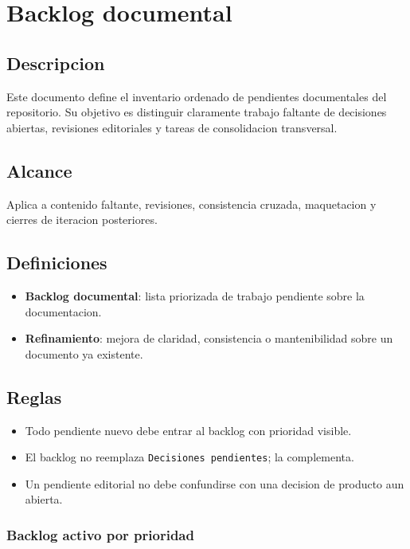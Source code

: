 \section{Backlog documental}

\subsection{Descripcion}

Este documento define el inventario ordenado de pendientes documentales del repositorio. Su objetivo es distinguir claramente trabajo faltante de decisiones abiertas, revisiones editoriales y tareas de consolidacion transversal.

\subsection{Alcance}

Aplica a contenido faltante, revisiones, consistencia cruzada, maquetacion y cierres de iteracion posteriores.

\subsection{Definiciones}

\begin{itemize}
  \item \textbf{Backlog documental}: lista priorizada de trabajo pendiente sobre la documentacion.
  \item \textbf{Refinamiento}: mejora de claridad, consistencia o mantenibilidad sobre un documento ya existente.
\end{itemize}

\subsection{Reglas}

\begin{itemize}
  \item Todo pendiente nuevo debe entrar al backlog con prioridad visible.
  \item El backlog no reemplaza \texttt{Decisiones pendientes}; la complementa.
  \item Un pendiente editorial no debe confundirse con una decision de producto aun abierta.
\end{itemize}

\subsubsection{Backlog activo por prioridad}

